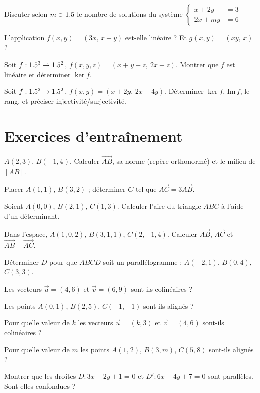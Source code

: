 \exo{} Discuter selon $m\in1.5$ le nombre de solutions du système
$\left\{\begin{aligned}x+2y&=3\\ 2x+my&=6\end{aligned}\right.$

\exo{} L'application $f(x,y)=(3x,\,x-y)$ est-elle linéaire ? Et $g(x,y)=(xy,\,x)$ ?

\exo{} Soit $f:1.5^3\to1.5^2$, $f(x,y,z)=(x+y-z,\ 2x-z)$. Montrer que $f$ est linéaire et
déterminer $\ker f$.

\exo{} Soit $f:1.5^2\to1.5^2$, $f(x,y)=(x+2y,\,2x+4y)$. Déterminer $\ker f$, $\mathrm{Im}\,f$,
le rang, et préciser injectivité/surjectivité.

\section{Exercices d'entraînement}

\exo{} $A(2,3)$, $B(-1,4)$. Calculer $\vec{AB}$, sa norme (repère orthonormé) et le
milieu de $[AB]$.

\exo{} Placer $A(1,1)$, $B(3,2)$ ; déterminer $C$ tel que $\vec{AC}=3\vec{AB}$.

\exo{} Soient $A(0,0)$, $B(2,1)$, $C(1,3)$. Calculer l'aire du triangle $ABC$ à l'aide d'un
déterminant.

\exo{} Dans l'espace, $A(1,0,2)$, $B(3,1,1)$, $C(2,-1,4)$. Calculer $\vec{AB}$, $\vec{AC}$
et $\vec{AB}+\vec{AC}$.

\exo{} Déterminer $D$ pour que $ABCD$ soit un parallélogramme : $A(-2,1)$, $B(0,4)$, $C(3,3)$.

\exo{} Les vecteurs $\vec u=(4,6)$ et $\vec v=(6,9)$ sont-ils colinéaires ?

\exo{} Les points $A(0,1)$, $B(2,5)$, $C(-1,-1)$ sont-ils alignés ?

\exo{} Pour quelle valeur de $k$ les vecteurs $\vec u=(k,3)$ et $\vec v=(4,6)$ sont-ils
colinéaires ?

\exo{} Pour quelle valeur de $m$ les points $A(1,2)$, $B(3,m)$, $C(5,8)$ sont-ils alignés ?

\exo{} Montrer que les droites $D:3x-2y+1=0$ et $D':6x-4y+7=0$ sont parallèles. Sont-elles
confondues ?

